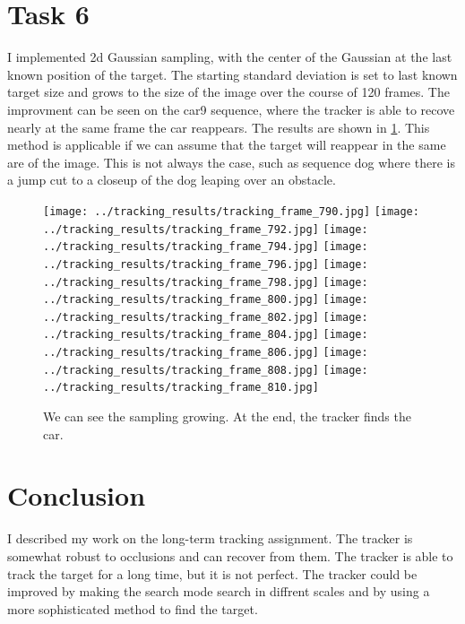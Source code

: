 \documentclass[9pt]{IEEEtran}
\begin{document}
\section{Task 6}
I implemented 2d Gaussian sampling, with the center of the Gaussian at the last known position of the target. The starting standard deviation is set to last known target size and grows to the size of the image over the course of 120 frames. The improvment can be seen on the car9 sequence, where the tracker is able to recove nearly at the same frame the car reappears. The results are shown in \ref{fig:task_6}. This method is applicable if we can assume that the target will reappear in the same are of the image. This is not always the case, such as sequence dog where there is a jump cut to a closeup of the dog leaping over an obstacle.
\begin{figure}[H]
    \centering
    \texttt{[image: ../tracking\_results/tracking\_frame\_790.jpg]} \hfill
    \vspace{1ex}
    \texttt{[image: ../tracking\_results/tracking\_frame\_792.jpg]} \hfill
    \vspace{1ex}
    \texttt{[image: ../tracking\_results/tracking\_frame\_794.jpg]} \hfill
    \vspace{1ex}
    \texttt{[image: ../tracking\_results/tracking\_frame\_796.jpg]} \hfill
    \vspace{1ex}
    \texttt{[image: ../tracking\_results/tracking\_frame\_798.jpg]} \hfill
    \vspace{1ex}
    \texttt{[image: ../tracking\_results/tracking\_frame\_800.jpg]} \hfill
    \vspace{1ex}
    \texttt{[image: ../tracking\_results/tracking\_frame\_802.jpg]} \hfill
    \vspace{1ex}
    \texttt{[image: ../tracking\_results/tracking\_frame\_804.jpg]} \hfill
    \vspace{1ex}
    \texttt{[image: ../tracking\_results/tracking\_frame\_806.jpg]} \hfill
    \vspace{1ex}
    \texttt{[image: ../tracking\_results/tracking\_frame\_808.jpg]} \hfill
    \vspace{1ex}
    \texttt{[image: ../tracking\_results/tracking\_frame\_810.jpg]} \hfill
    \vspace{1ex}

    
    \caption{We can see the sampling growing. At the end, the tracker finds the car.}
    \label{fig:task_6} %
\end{figure}



\section{Conclusion}
I described my work on the long-term tracking assignment. The tracker is somewhat robust to occlusions and can recover from them. The tracker is able to track the target for a long time, but it is not perfect. The tracker could be improved by making the search mode search in diffrent scales and by using a more sophisticated method to find the target. 



\end{document}

